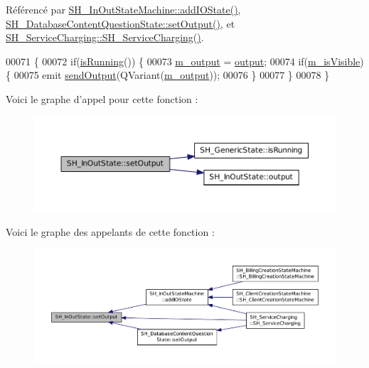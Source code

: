Référencé par \hyperlink{classSH__InOutStateMachine_a2528cffddbe6f98c32ebef41423c0118}{S\-H\-\_\-\-In\-Out\-State\-Machine\-::add\-I\-O\-State()}, \hyperlink{classSH__DatabaseContentQuestionState_aaec6c7f8bc78c6beb7447fc41ffe3875}{S\-H\-\_\-\-Database\-Content\-Question\-State\-::set\-Output()}, et \hyperlink{classSH__ServiceCharging_afa5273d046049b1c2b020a6a19a8290b}{S\-H\-\_\-\-Service\-Charging\-::\-S\-H\-\_\-\-Service\-Charging()}.


\begin{DoxyCode}
00071 \{
00072     \textcolor{keywordflow}{if}(\hyperlink{classSH__GenericState_a5f731810dad0cacd28828ccbf1539e4e}{isRunning}()) \{
00073         \hyperlink{classSH__InOutState_ae735e741ce229d2600448d8daa0abc2d}{m\_output} = \hyperlink{classSH__InOutState_a17ed7eaf5e3ed5af80a4f9fe65d5bfd9}{output};
00074         \textcolor{keywordflow}{if}(\hyperlink{classSH__InOutState_a8fd66b185c9a55f0e84daa97e2acf53a}{m\_isVisible}) \{
00075             emit \hyperlink{classSH__InOutState_a77921c5f42059bc97361f4ff7827da12}{sendOutput}(QVariant(\hyperlink{classSH__InOutState_ae735e741ce229d2600448d8daa0abc2d}{m\_output}));
00076         \}
00077     \}
00078 \}
\end{DoxyCode}


Voici le graphe d'appel pour cette fonction \-:\nopagebreak
\begin{figure}[H]
\begin{center}
\leavevmode
\includegraphics[width=350pt]{classSH__InOutState_af611c84134e262739cd834797b315c80_cgraph}
\end{center}
\end{figure}




Voici le graphe des appelants de cette fonction \-:\nopagebreak
\begin{figure}[H]
\begin{center}
\leavevmode
\includegraphics[width=350pt]{classSH__InOutState_af611c84134e262739cd834797b315c80_icgraph}
\end{center}
\end{figure}


